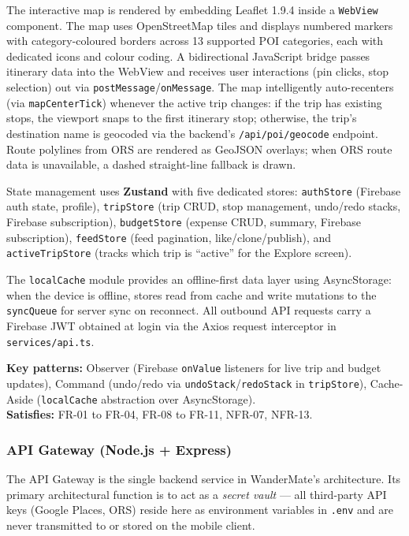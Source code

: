 \documentclass[12pt, a4paper]{article}
\begin{document}
The interactive map is rendered by embedding Leaflet 1.9.4 inside a \texttt{WebView} component. The map uses OpenStreetMap tiles and displays numbered markers with category-coloured borders across 13 supported POI categories, each with dedicated icons and colour coding. A bidirectional JavaScript bridge passes itinerary data into the WebView and receives user interactions (pin clicks, stop selection) out via \texttt{postMessage}/\texttt{onMessage}. The map intelligently auto-recenters (via \texttt{mapCenterTick}) whenever the active trip changes: if the trip has existing stops, the viewport snaps to the first itinerary stop; otherwise, the trip's destination name is geocoded via the backend's \texttt{/api/poi/geocode} endpoint. Route polylines from ORS are rendered as GeoJSON overlays; when ORS route data is unavailable, a dashed straight-line fallback is drawn.

State management uses \textbf{Zustand} with five dedicated stores: \texttt{authStore} (Firebase auth state, profile), \texttt{tripStore} (trip CRUD, stop management, undo/redo stacks, Firebase subscription), \texttt{budgetStore} (expense CRUD, summary, Firebase subscription), \texttt{feedStore} (feed pagination, like/clone/publish), and \texttt{activeTripStore} (tracks which trip is ``active'' for the Explore screen).

The \texttt{localCache} module provides an offline-first data layer using AsyncStorage: when the device is offline, stores read from cache and write mutations to the \texttt{syncQueue} for server sync on reconnect. All outbound API requests carry a Firebase JWT obtained at login via the Axios request interceptor in \texttt{services/api.ts}.

\begin{tcolorbox}[notebox]
  \textbf{Key patterns:} Observer (Firebase \texttt{onValue} listeners for live trip and budget updates), Command (undo/redo via \texttt{undoStack}/\texttt{redoStack} in \texttt{tripStore}), Cache-Aside (\texttt{localCache} abstraction over AsyncStorage).\\[2pt]
  \textbf{Satisfies:} FR-01 to FR-04, FR-08 to FR-11, NFR-07, NFR-13.
\end{tcolorbox}

\subsubsection{API Gateway (Node.js + Express)}

The API Gateway is the single backend service in WanderMate's architecture. Its primary architectural function is to act as a \emph{secret vault} --- all third-party API keys (Google Places, ORS) reside here as environment variables in \texttt{.env} and are never transmitted to or stored on the mobile client.
\end{document}
